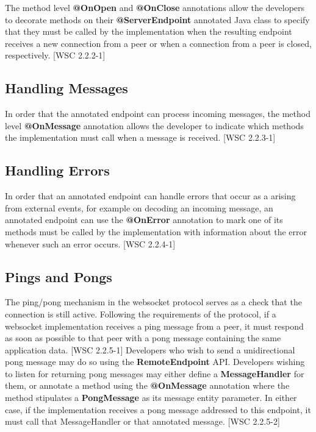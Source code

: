 The method level \textbf{@OnOpen} and \textbf{@OnClose} annotations allow the developers to decorate methods on their \textbf{@ServerEndpoint} annotated Java class to specify that they must be called by the implementation when the resulting endpoint receives a new connection from a peer or when a connection from a peer is closed, respectively. [WSC 2.2.2-1]

\subsection{Handling Messages}

In order that the annotated endpoint can process incoming messages, the method level \textbf{@OnMessage} annotation allows the developer to indicate which methods the implementation must call when a message is received.  [WSC 2.2.3-1]

\subsection{Handling Errors}

In order that an annotated endpoint can handle errors that occur as a arising from external events, for example on decoding an incoming message, an annotated endpoint can use the \textbf{@OnError} annotation to mark one of its methods must be called by the implementation with information about the error whenever such an error occurs. [WSC 2.2.4-1]

\subsection{Pings and Pongs}

The ping/pong mechanism in the websocket protocol serves as a check that the connection is still active. Following the requirements of the protocol, if a websocket implementation receives a ping message from a peer, it must respond as soon as possible to that peer with a pong message containing the same application data. [WSC 2.2.5-1] Developers who wish to send a unidirectional pong message may do so using the \textbf{RemoteEndpoint} API. Developers wishing to listen for returning pong messages may either define a \textbf{MessageHandler} for them, or annotate a method using the \textbf{@OnMessage} annotation where the method stipulates a \textbf{PongMessage} as its message entity parameter. In either case, if the implementation receives a pong message addressed to this endpoint, it must call that MessageHandler or that annotated message. [WSC 2.2.5-2]



